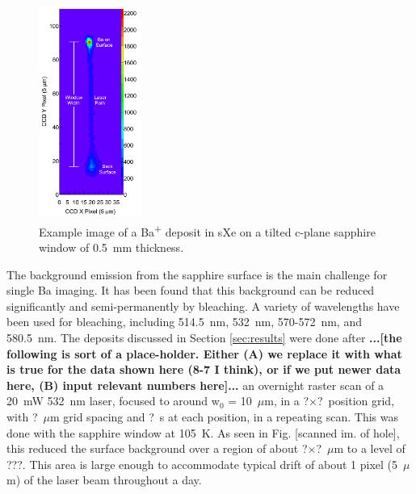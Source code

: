 \documentclass[aps,pra,reprint,superscriptaddress]{revtex4-1}
\begin{document}
\begin{figure}
\includegraphics[width=0.3\textwidth]{figures/imageExamp_fromthesis.png}
\caption{Example image of a Ba\textsuperscript{+} deposit in sXe on a tilted c-plane sapphire window of 0.5~mm thickness.} %
\label{fig:image_example}
\end{figure}

The background emission from the sapphire surface is the main challenge for single Ba imaging.  It has been found that this background can be reduced significantly and semi-permanently by bleaching.  A variety of wavelengths have been used for bleaching, including 514.5~nm, 532~nm, 570-572~nm, and 580.5~nm.  The deposits discussed in Section \ref{sec:results} were done after {\color{gray}\textbf{...[the following is sort of a place-holder.  Either (A) we replace it with what is true for the data shown here (8-7 I think), or if we put newer data here, (B) input relevant numbers here]...} an overnight raster scan of a 20~mW 532~nm laser, focused to around w$_{0}$ = 10~$\mu$m, in a {\color{gray}?$\times$?}~position grid, with {\color{gray}?}~$\mu$m grid spacing and {\color{gray}?}~s at each position, in a repeating scan.  This was done with the sapphire window at 105~K.  As seen in Fig. [scanned im. of hole], this reduced the surface background over a region of about {\color{gray}?$\times$?}~$\mu$m to a level of ???.  This area is large enough to accommodate typical drift of about 1 pixel (5~$\mu$m) of the laser beam throughout a day.}

\end{document}
